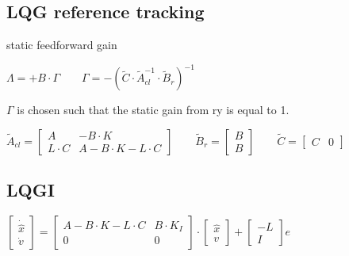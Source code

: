 \documentclass[10pt,a4paper]{scrartcl}
\begin{document}
\begin{multicols*}{3}
	\subsection{LQG reference tracking}
	
	\dahe static feedforward gain
	
	
	
	$\Lambda=$$+B\cdot\Gamma\qquad\Gamma=-\left(\tilde{C}\cdot\tilde{A}_{cl}^{-1}\cdot\tilde{B}_r\right)^{-1}$
	
	
	$\Gamma$ is chosen such that the static gain from r\dahe y is equal to 1.	
	
	
	$\tilde{A}_{cl}=\begin{bmatrix}A&-B\cdot K\\L\cdot C&A-B\cdot K-L\cdot C\end{bmatrix}\qquad\tilde{B}_r=\begin{bmatrix}B\\B\end{bmatrix}\qquad \tilde{C}=\begin{bmatrix}C&0\end{bmatrix}$
	
	
	\subsection{LQGI}
	
	
	\finn
	
	
	$\begin{bmatrix}\dot{\hat{x}}\\\dot{v}\end{bmatrix}=\begin{bmatrix}A-B\cdot K-L\cdot C&B\cdot K_I\\0&0\end{bmatrix}\cdot\begin{bmatrix}\hat{x}\\v\end{bmatrix}+\begin{bmatrix}-L\\I\end{bmatrix}e$
	

\end{multicols*}
\end{document}
